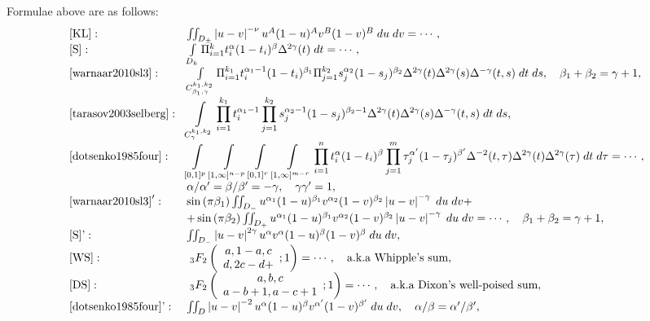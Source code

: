\documentclass[a4paper,12pt]{article}
\begin{document}
Formulae above are as follows:\begin{equation*}
	\begin{array}[]{ll}
		\mbox{[KL]}:&\iint_{D_\pm}\myabs{u-v}^{-\nu}u^A(1-u)^Av^B(1-v)^B\;du\;dv=\cdots,\\
		\mbox{[S]}:&\int_{D_k}\Pi_{i=1}^kt_i^\alpha(1-t_i)^\beta\Delta^{2\gamma}(t)\;dt=\cdots,\\
		\mbox{\cite{warnaar2010sl3}}:&\int_{C_{\beta_1,\gamma}^{k_1,k_2}}\Pi_{i=1}^{k_1}t_i^{\alpha_1-1}(1-t_i)^{\beta_1}\Pi_{j=1}^{k_2}s_j^{\alpha_2}(1-s_j)^{\beta_2}
		\Delta^{2\gamma}(t)\Delta^{2\gamma}(s)\Delta^{-\gamma}(t,s)\;dt\;ds,\quad\beta_1+\beta_2=\gamma+1,\\
		\mbox{\cite{tarasov2003selberg}}:&\displaystyle\int_{C^{k_1,k_2}_{\gamma}}\prod_{i=1}^{k_1}t_i^{\alpha_1-1}\prod_{j=1}^{k_2}s_j^{\alpha_2-1}(1-s_j)^{\beta_2-1}\Delta^{2\gamma}(t)\Delta^{2\gamma}
		(s)\Delta^{-\gamma}(t,s)\;dt\;ds,\\
		\mbox{\cite{dotsenko1985four}}:&\displaystyle\int_{[0,1]^p}\int_{[1,\infty]^{n-p}}\int_{[0,1]^r}\int_{[1,\infty]^{m-r}}\prod_{i=1}^nt_i^\alpha(1-t_i)^\beta
		\prod_{j=1}^m\tau_j^{\alpha'}(1-\tau_j)^{\beta'}\Delta^{-2}(t,\tau)\Delta^{2\gamma}(t)\Delta^{2\gamma}(\tau)\;dt\;d\tau=\cdots,\\
		&{\alpha}/{\alpha'}={\beta}/{\beta'}=-\gamma,\quad\gamma\gamma'=1,\\
		\mbox{\cite{warnaar2010sl3}}':&\sin\mybra{\pi\beta_1}\iint_{D_-}u^{\alpha_1}(1-u)^{\beta_1}v^{\alpha_2}(1-v)^{\beta_2}\myabs{u-v}^{-\gamma}\;du\;dv+\\
		&+\sin\mybra{\pi\beta_2}\iint_{D_+}u^{\alpha_1}(1-u)^{\beta_1}v^{\alpha_2}(1-v)^{\beta_2}\myabs{u-v}^{-\gamma}\;du\;dv=\cdots,\quad \beta_1+\beta_2=\gamma+1,\\
		\mbox{[S]'}:&\iint_{D_-}\myabs{u-v}^{2\gamma}u^\alpha v^\alpha(1-u)^\beta(1-v)^\beta\;du\;dv,\\
		\mbox{[WS]}:&\;_3F_2\left(\begin{array}[]{c}
			a,1-a,c\\ d,2c-d+
		\end{array};1\right)=\cdots,\quad\mbox{a.k.a Whipple's sum},\\
		\mbox{[DS]}:&\;_3F_2\left(\begin{array}[]{c}
			a,b,c\\a-b+1,a-c+1
		\end{array};1\right)=\cdots,\quad\mbox{a.k.a Dixon's well-poised sum},\\
		\mbox{\cite{dotsenko1985four}'}:&\iint_D\myabs{u-v}^{-2}u^\alpha(1-u)^\beta v^{\alpha'}(1-v)^{\beta'}\;du\;dv,\quad \alpha/\beta=\alpha'/\beta',\\
	\end{array}
\end{equation*}
\end{document}
